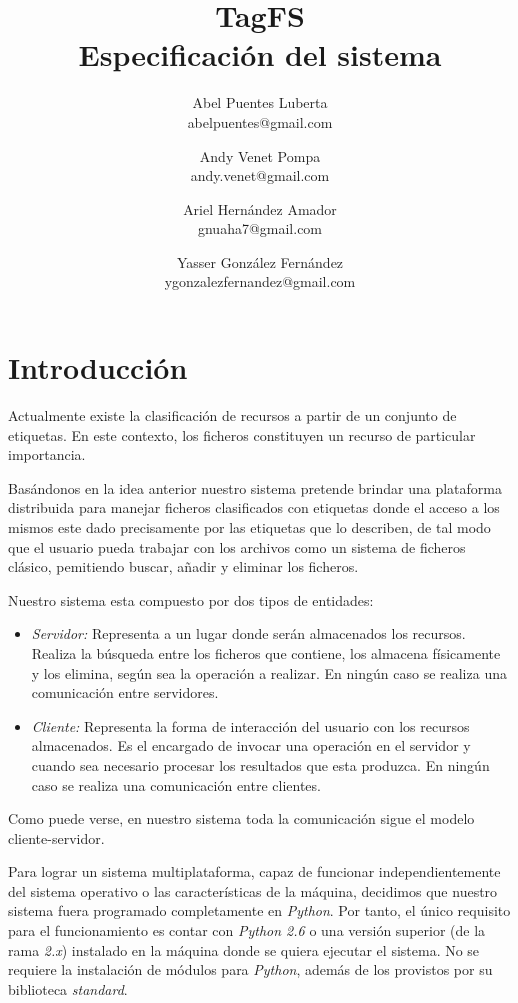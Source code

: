 \documentclass{article}
\title{
	\LARGE{TagFS} \\
	\Large{Especificación del sistema}
}
\author{
  	Abel Puentes Luberta \\
  	\small{abelpuentes@gmail.com}
  	\and
  	Andy Venet Pompa \\
  	\small{andy.venet@gmail.com}
  	\and
  	Ariel Hernández Amador \\
  	\small{gnuaha7@gmail.com}
  	\and
  	Yasser González Fernández \\
  	\small{ygonzalezfernandez@gmail.com}
}
\date{}
\begin{document}
\maketitle

\thispagestyle{empty}

\newpage

\setcounter{page}{1}

\section{Introducción}

Actualmente existe la clasificación de recursos a partir de un conjunto de 
etiquetas. En este contexto, los ficheros constituyen un recurso de particular 
importancia. 

Basándonos en la idea anterior nuestro sistema pretende brindar una plataforma
distribuida para manejar ficheros clasificados con etiquetas donde el acceso
a los mismos este dado precisamente por las etiquetas que lo describen, de tal
modo que el usuario pueda trabajar con los archivos como un sistema de ficheros
clásico, pemitiendo buscar, añadir y eliminar los ficheros.

Nuestro sistema esta compuesto por dos tipos de entidades:

\begin{itemize}
  \item \emph{Servidor:} Representa a un lugar  donde serán almacenados los
  recursos. Realiza la búsqueda entre los ficheros que contiene, los almacena
  físicamente y los elimina, según sea la operación a realizar. En ningún caso
  se realiza una comunicación entre servidores.
  
  \item \emph{Cliente:} Representa la forma de interacción del usuario con los
  recursos almacenados. Es el encargado de invocar una operación en el servidor
  y cuando sea necesario procesar los resultados que esta produzca. En ningún
  caso se realiza una comunicación entre clientes.
\end{itemize}

Como puede verse, en nuestro sistema toda la comunicación sigue el modelo
cliente-servidor.

Para lograr un sistema multiplataforma, capaz de funcionar independientemente
del sistema operativo o las características de la máquina, decidimos que nuestro
sistema fuera programado completamente en \emph{Python}. Por tanto, el único
requisito para el funcionamiento es contar con \emph{Python 2.6} o una versión
superior (de la rama \emph{2.x}) instalado en la máquina donde se quiera ejecutar 
el sistema. No se requiere la instalación de módulos para \emph{Python},
además de los provistos por su biblioteca \emph{standard}.
\end{document}
